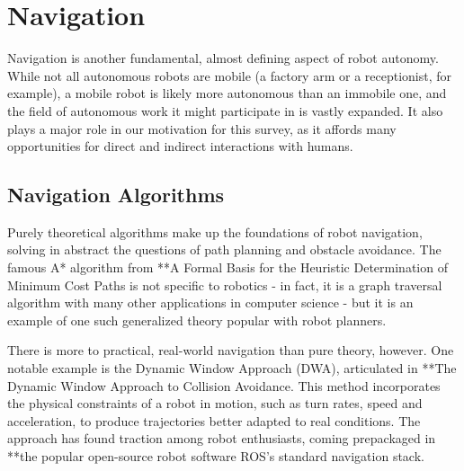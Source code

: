 \documentclass{sfuthesis}
\begin{document}












\section{Navigation}

Navigation is another fundamental, almost defining aspect of robot autonomy. While not all autonomous robots are mobile (a factory arm or a receptionist, for example), a mobile robot is likely more autonomous than an immobile one, and the field of autonomous work it might participate in is vastly expanded. It also plays a major role in our motivation for this survey, as it affords many opportunities for direct and indirect interactions with humans.






\subsection{Navigation Algorithms}

Purely theoretical algorithms make up the foundations of robot navigation, solving in abstract the questions of path planning and obstacle avoidance. The famous A* algorithm from **A Formal Basis for the Heuristic Determination of Minimum Cost Paths is not specific to robotics - in fact, it is a graph traversal algorithm with many other applications in computer science - but it is an example of one such generalized theory popular with robot planners. 

There is more to practical, real-world navigation than pure theory, however. One notable example is the Dynamic Window Approach (DWA), articulated in **The Dynamic Window Approach to Collision Avoidance. This method incorporates the physical constraints of a robot in motion, such as turn rates, speed and acceleration, to produce trajectories better adapted to real conditions. The approach has found traction among robot enthusiasts, coming prepackaged in **the popular open-source robot software ROS's standard navigation stack.
\end{document}
